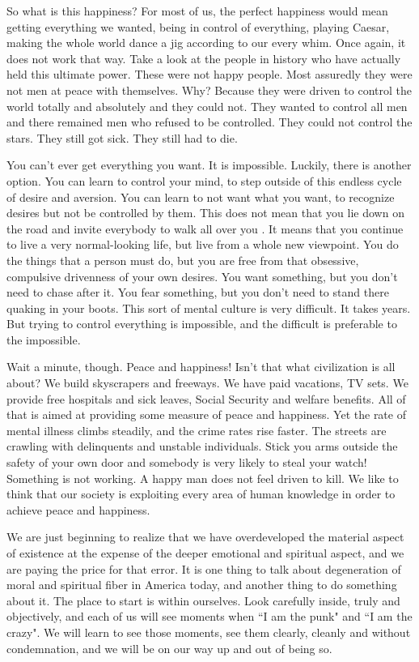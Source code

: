 So what is this happiness? For most of us, the perfect happiness would mean
getting everything we wanted, being in control of everything, playing Caesar,
making the whole world dance a jig according to our every whim. Once again, it
does not work that way. Take a look at the people in history who have actually
held this ultimate power. These were not happy people. Most assuredly they were
not men at peace with themselves. Why? Because they were driven to control the
world totally and absolutely and they could not. They wanted to control all men
and there remained men who refused to be controlled. They could not control the
stars. They still got sick. They still had to die.

You can't ever get everything you want. It is impossible. Luckily, there is
another option. You can learn to control your mind, to step outside of this
endless cycle of desire and aversion. You can learn to not want what you want,
to recognize desires but not be controlled by them. This does not mean that you
lie down on the road and invite everybody to walk all over you . It means that
you continue to live a very normal-looking life, but live from a whole new
viewpoint. You do the things that a person must do, but you are free from that
obsessive, compulsive drivenness of your own desires. You want something, but
you don't need to chase after it. You fear something, but you don't need to
stand there quaking in your boots. This sort of mental culture is very
difficult.  It takes years. But trying to control everything is impossible, and
the difficult is preferable to the impossible.

Wait a minute, though. Peace and happiness! Isn't that what civilization is all
about? We build skyscrapers and freeways. We have paid vacations, TV sets. We
provide free hospitals and sick leaves, Social Security and welfare benefits.
All of that is aimed at providing some measure of peace and happiness. Yet the
rate of mental illness climbs steadily, and the crime rates rise faster.  The
streets are crawling with delinquents and unstable individuals. Stick you arms
outside the safety of your own door and somebody is very likely to steal your
watch! Something is not working. A happy man does not feel driven to kill. We
like to think that our society is exploiting every area of human knowledge in
order to achieve peace and happiness.

We are just beginning to realize that we have overdeveloped the material aspect
of existence at the expense of the deeper emotional and spiritual aspect, and we
are paying the price for that error. It is one thing to talk about degeneration
of moral and spiritual fiber in America today, and another thing to do something
about it. The place to start is within ourselves. Look carefully inside, truly
and objectively, and each of us will see moments when ``I am the punk" and ``I am
the crazy". We will learn to see those moments, see them clearly, cleanly and
without condemnation, and we will be on our way up and out of being so.

